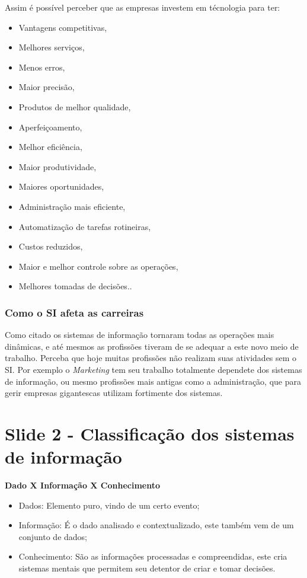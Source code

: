 \documentclass[
	12pt,				%
	openany,			%
	a4paper,			%
	chapter=TITLE,		%
	section=TITLE,		%
	english,
	brazil				%
]{abntex2}
\begin{document}
\begin{itemize}
Assim é possível perceber que as empresas investem em técnologia para ter:
	\begin{itemize}
		\item Vantagens competitivas,
		\item Melhores serviços,
		\item Menos erros,
		\item Maior precisão, 
		\item Produtos de melhor qualidade,
		\item Aperfeiçoamento,
		\item Melhor eficiência,
		\item Maior produtividade, 
		\item Maiores oportunidades,
		\item Administração mais eficiente,
		\item Automatização de tarefas rotineiras,
		\item Custos reduzidos,
		\item Maior e melhor controle sobre as operações,
		\item Melhores tomadas de decisões..
	\end{itemize}

\subsection{Como o SI afeta as carreiras}
Como citado os sistemas de informação tornaram todas as operações mais dinâmicas, e até mesmos as profissões tiveram de se adequar a este novo meio de trabalho. Perceba que hoje muitas profissões não realizam suas atividades sem o SI. Por exemplo o \textit{Marketing} tem seu trabalho totalmente dependete dos sistemas de informação, ou mesmo profissões mais antigas como a administração, que para gerir empresas gigantescas utilizam fortimente dos sistemas.




\chapter{Slide 2 - Classificação dos sistemas de informação}

\textbf{Dado X Informação X Conhecimento}
	\begin{itemize}
		\item Dados: Elemento puro, vindo de um certo evento;
		\item Informação: É o dado analisado e contextualizado, este também vem de um conjunto de dados;
		\item Conhecimento: São as informações processadas e compreendidas, este cria sistemas mentais que permitem seu detentor de criar e tomar decisões.
	\end{itemize}


\end{itemize}
\end{document}
